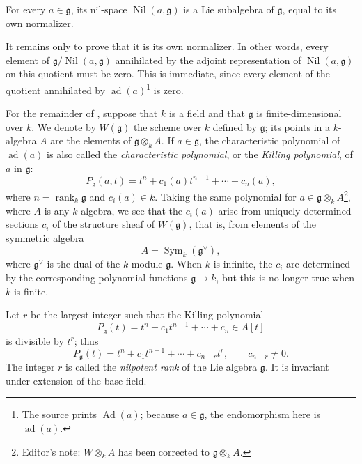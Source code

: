\begin{proposition}
For every \(a\in\mathfrak g\), its nil-space
\(\operatorname{Nil}(a,\mathfrak g)\) is a Lie subalgebra of
\(\mathfrak g\), equal to its own normalizer.
\end{proposition}

It remains only to prove that it is its own normalizer. In other
words, every element of
\(\mathfrak g/\operatorname{Nil}(a,\mathfrak g)\) annihilated by the
adjoint representation of \(\operatorname{Nil}(a,\mathfrak g)\) on
this quotient must be zero. This is immediate, since every element
of the quotient annihilated by \(\operatorname{ad}(a)\)\footnote{The
source prints \(\operatorname{Ad}(a)\); because
\(a\in\mathfrak g\), the endomorphism here is
\(\operatorname{ad}(a)\).} is zero.

For the remainder of , suppose that \(k\) is a field and
that \(\mathfrak g\) is finite-dimensional over \(k\). We denote by
\(W(\mathfrak g)\) the scheme over \(k\) defined by \(\mathfrak g\);
its points in a \(k\)-algebra \(A\) are the elements of
\(\mathfrak g\otimes_k A\). If \(a\in\mathfrak g\), the
characteristic polynomial of \(\operatorname{ad}(a)\) is also called
the \emph{characteristic polynomial}, or the \emph{Killing
polynomial}, of \(a\) in \(\mathfrak g\):
\[
  P_{\mathfrak g}(a,t)
  =
  t^n+c_1(a)t^{n-1}+\cdots+c_n(a),
\]
where \(n=\operatorname{rank}_k\mathfrak g\) and \(c_i(a)\in k\).
Taking the same polynomial for
\(a\in\mathfrak g\otimes_k A\)\footnote{Editor's note:
\(W\otimes_k A\) has been corrected to
\(\mathfrak g\otimes_k A\).}, where \(A\) is any \(k\)-algebra, we
see that the \(c_i(a)\) arise from uniquely determined sections
\(c_i\) of the structure sheaf of \(W(\mathfrak g)\), that is, from
elements of the symmetric algebra
\[
  A=\operatorname{Sym}_k(\mathfrak g^\vee),
\]
where \(\mathfrak g^\vee\) is the dual of the \(k\)-module
\(\mathfrak g\). When \(k\) is infinite, the \(c_i\) are determined
by the corresponding polynomial functions \(\mathfrak g\to k\), but
this is no longer true when \(k\) is finite.

Let \(r\) be the largest integer such that the Killing polynomial
\[
  P_{\mathfrak g}(t)
  =
  t^n+c_1t^{n-1}+\cdots+c_n
  \in A[t]
\]
is divisible by \(t^r\); thus
\[
  P_{\mathfrak g}(t)
  =
  t^n+c_1t^{n-1}+\cdots+c_{n-r}t^r,
  \qquad c_{n-r}\neq0.
\]
The integer \(r\) is called the \emph{nilpotent rank} of the Lie
algebra \(\mathfrak g\). It is invariant under extension of the base
field.

